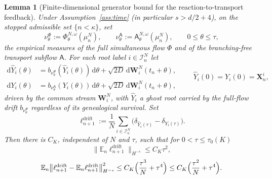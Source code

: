 \documentclass[a4paper,fleqn]{cas-sc}
\newtheorem{lemma}[theorem]{Lemma}
\theoremstyle{definition}
\theoremstyle{remark}
\begin{document}
\begin{lemma}[Finite-dimensional generator bound for the reaction-to-transport feedback]\label{lem:drift-feedback-generator}
Under Assumption~\ref{ass:time} (in particular $s>d/2+4$), on the stopped admissible
set $\{n<\kappa\}$, set
\[
\nu^\Phi_\theta:=\Phi^{N,\omega}_\theta(\mu^N_n),\qquad
\nu^{\mathsf A}_\theta:=\mathsf A^{N,\omega}_\theta(\mu^N_n),\qquad 0\le\theta\le\tau,
\]
the empirical measures of the full simultaneous flow $\Phi$ and of the branching-free
transport subflow $\mathsf A$. For each root label $i\in\mathcal I^N_n$ let
\[
\begin{aligned}
\mathrm d\widehat Y_i(\theta)
&= b_{\nu^\Phi_\theta}(\widehat Y_i(\theta))\,\mathrm d\theta
   +\sqrt{2D}\,\mathrm d\mathbf W^N_i(t_n+\theta),\\
\mathrm dY_i(\theta)
&= b_{\nu^{\mathsf A}_\theta}(Y_i(\theta))\,\mathrm d\theta
   +\sqrt{2D}\,\mathrm d\mathbf W^N_i(t_n+\theta),
\end{aligned}
\qquad
\widehat Y_i(0)=Y_i(0)=\mathbf X^i_n,
\]
driven by the common stream $\mathbf W^N_i$, with $\widehat Y_i$ a ghost root carried by the
full-flow drift $b_{\nu^\Phi_\theta}$ regardless of its genealogical survival. Set
\[
\ell^{\mathrm{drift}}_{n+1}
:=\frac1N\sum_{i\in\mathcal I^N_n}\bigl(\delta_{\widehat Y_i(\tau)}-\delta_{Y_i(\tau)}\bigr).
\]
Then there is $C_K$, independent of $N$ and $\tau$, such that for $0<\tau\le\tau_0(K)$
\[
\bigl\|\mathbb E_n\ell^{\mathrm{drift}}_{n+1}\bigr\|_{H^{-s}}\le C_K\tau^2,
\]
\[
\mathbb E_n\bigl\|\ell^{\mathrm{drift}}_{n+1}-\mathbb E_n\ell^{\mathrm{drift}}_{n+1}\bigr\|_{H^{-s}}^2
\le C_K\Bigl(\frac{\tau^3}{N}+\tau^4\Bigr)
\le C_K\Bigl(\frac{\tau^2}{N}+\tau^4\Bigr).
\]
\end{lemma}
\end{document}
